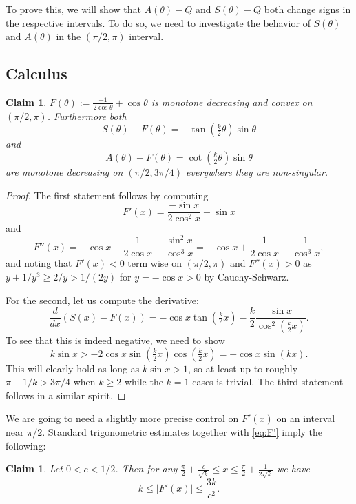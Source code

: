 \documentclass{article}
\newtheorem{claim}[theorem]{Claim}
\theoremstyle{definition}
\numberwithin{equation}{section}
\numberwithin{theorem}{section}
\begin{document}
To prove this, we will show that $A(\theta)-Q$ and $S(\theta)-Q$ both change signs in the respective intervals. To do so, we need to investigate the behavior of $S(\theta)$ and $A(\theta)$ in the $(\pi/2,\pi)$ interval.

\subsection{Calculus}

 

\begin{claim}\label{cl:monotone}
    $F(\theta):= \tfrac{-1}{2\cos \theta} + \cos \theta$ is monotone decreasing and convex on $(\pi/2,\pi)$. Furthermore both 
    \[S(\theta)-F(\theta) = -\tan\left(\tfrac{k}{2} \theta\right) \sin \theta\] and 
    \[A(\theta) - F(\theta)= \cot\left(\tfrac{k}{2} \theta\right) \sin \theta\] are monotone decreasing on $(\pi/2,3\pi/4)$ everywhere they are non-singular.
\end{claim}

\begin{proof} The first statement follows by computing 
\begin{equation}\label{eq:F'} F'(x) = \frac{-\sin x}{2\cos^2 x} - \sin x\end{equation} and 
\[ F''(x) = -\cos x - \frac{1}{2\cos x} - \frac{\sin^2 x}{\cos^3 x} = -\cos x +\frac{1}{2\cos x} - \frac{1}{\cos^3 x},\] and noting that $F'(x) < 0$ term wise on $(\pi/2,\pi)$ and $F''(x) > 0$ as $y+1/y^3 \geq 2/y > 1/(2y)$ for $y = -\cos x >0$ by Cauchy-Schwarz.

     For the second, let us compute the derivative:
    \[\frac{d}{d x} (S(x)-F(x))= -\cos x \tan\left(\tfrac{k}{2} x\right)- \frac{k}{2}\frac{\sin x}{\cos^2\left(\tfrac{k}{2} x\right)}.
    \] To see that this is indeed negative, we need to show 
    \[ k \sin x >-2\cos x \sin\left(\tfrac{k}{2} x\right)\cos\left(\tfrac{k}{2} x\right) = -\cos x \sin(k x). \] This will clearly hold as long as $k\sin x >1$, so at least up to roughly $\pi - 1/k > 3\pi/4$ when $k\geq 2$ while the $k=1$ cases is trivial. The third statement follows in a similar spirit.
\end{proof}

We are going to need a slightly more precise control on $F'(x)$ on an interval near $\pi/2$. Standard trigonometric estimates together with \eqref{eq:F'} imply the following:
\begin{claim}\label{cl:F'}
Let $ 0 < c < 1/2$. Then for any $\tfrac{\pi}{2}+\tfrac{c}{\sqrt{k}} \leq x \leq  \tfrac{\pi}{2} + \tfrac{1}{2\sqrt{k}}$ we have 
\[ k \leq |F'(x)| \leq \frac{3k}{c^2}.\]
\end{claim}
\end{document}
